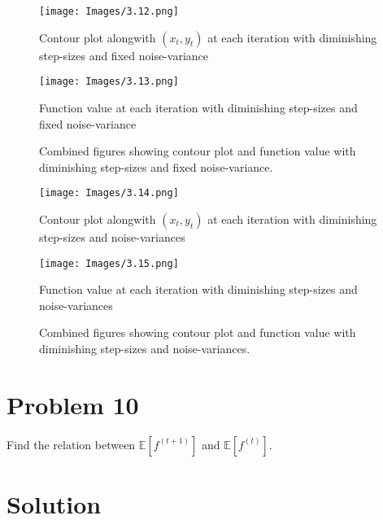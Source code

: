 \documentclass{article}
\begin{document}
\begin{figure}[H]
    \centering
    \begin{minipage}{0.48\textwidth}
        \centering
        \texttt{[image: Images/3.12.png]}
        \caption{Contour plot alongwith $(x_t, y_t)$ at each iteration with diminishing step-sizes and fixed noise-variance}
        \label{fig:function_value_8}
    \end{minipage}
    \begin{minipage}{0.48\textwidth}
        \centering
        \texttt{[image: Images/3.13.png]}
        \caption{Function value at each iteration with diminishing step-sizes and fixed noise-variance}
        \label{fig:function_value_9}
    \end{minipage}
    \caption{Combined figures showing contour plot and function value with diminishing step-sizes and fixed noise-variance.}
    \label{fig:combined_figures_5}
\end{figure}

\begin{figure}[H]
    \centering
    \begin{minipage}{0.48\textwidth}
        \centering
        \texttt{[image: Images/3.14.png]}
        \caption{Contour plot alongwith $(x_t, y_t)$ at each iteration with diminishing step-sizes and noise-variances}
        \label{fig:function_value_10}
    \end{minipage}
    \begin{minipage}{0.48\textwidth}
        \centering
        \texttt{[image: Images/3.15.png]}
        \caption{Function value at each iteration with diminishing step-sizes and noise-variances}
        \label{fig:function_value_11}
    \end{minipage}
    \caption{Combined figures showing contour plot and function value with diminishing step-sizes and noise-variances.}
    \label{fig:combined_figures_6}
\end{figure}

\section*{Problem 10}

Find the relation between $\mathbb{E}[f^{(t+1)}]$ and $\mathbb{E}[f^{(t)}]$.

\section*{Solution}
\end{document}
